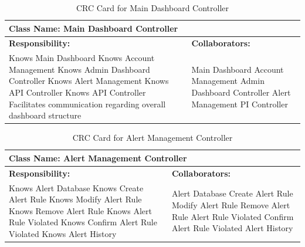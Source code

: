 \documentclass[]{article}
\begin{document}
\begin{table}[H]
    \centering
    \caption{CRC Card for Main Dashboard Controller}
    \vspace{1mm}
    \begin{tabular}{|p{7.5cm}|p{7.5cm}|}
    \hline 
      \multicolumn{2}{|l|}{\textbf{Class Name: Main Dashboard Controller}} \\
    \hline
    \textbf{Responsibility:} & \textbf{Collaborators:} \\
    \hline
        Knows Main Dashboard \newline
        Knows Account Management \newline
        Knows Admin Dashboard Controller \newline
        Knows Alert Management \newline
        Knows API Controller \newline
        Knows API Controller \newline
        Facilitates communication regarding overall dashboard structure \newline
        &
        Main Dashboard \newline
        Account Management \newline
        Admin Dashboard Controller \newline
        Alert Management \newline
        PI Controller \\
    \hline
    \end{tabular}
\end{table}
\begin{table}[H]
    \centering
    \caption{CRC Card for Alert Management Controller}
    \vspace{1mm}
    \begin{tabular}{|p{7.5cm}|p{7.5cm}|}
    \hline 
      \multicolumn{2}{|l|}{\textbf{Class Name: Alert Management Controller}} \\
    \hline
    \textbf{Responsibility:} & \textbf{Collaborators:} \\
    \hline
        Knows Alert Database \newline
        Knows Create Alert Rule \newline
        Knows Modify Alert Rule \newline 
        Knows Remove Alert Rule \newline
        Knows Alert Rule Violated \newline
        Knows Confirm Alert Rule Violated \newline
        Knows Alert History \newline
        & 
        Alert Database \newline
        Create Alert Rule \newline
        Modify Alert Rule \newline 
        Remove Alert Rule \newline
        Alert Rule Violated \newline
        Confirm Alert Rule Violated \newline
        Alert History \\
    \hline
    \end{tabular}
\end{table}
\end{document}
